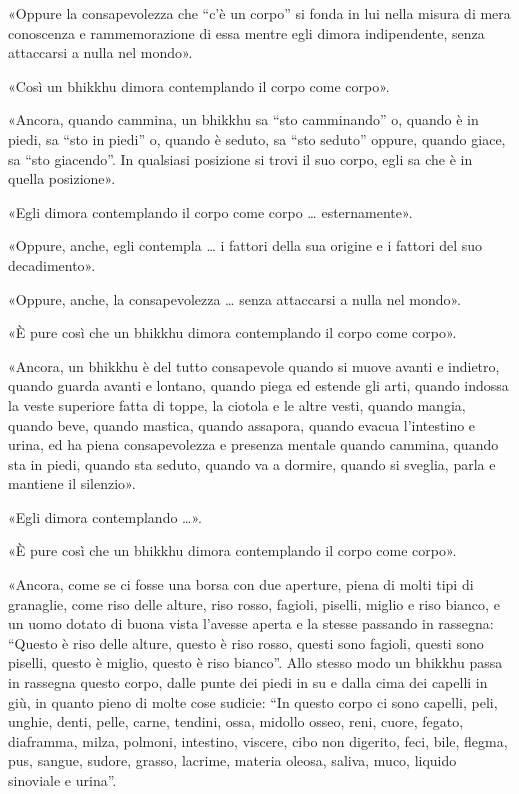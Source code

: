 «Oppure la consapevolezza che “c’è un corpo” si fonda in lui nella
misura di mera conoscenza e rammemorazione di essa mentre egli dimora
indipendente, senza attaccarsi a nulla nel mondo».


«Così un bhikkhu dimora contemplando il corpo come corpo».


«Ancora, quando cammina, un bhikkhu sa “sto camminando” o, quando è in
piedi, sa “sto in piedi” o, quando è seduto, sa “sto seduto” oppure,
quando giace, sa “sto giacendo”. In qualsiasi posizione si trovi il suo
corpo, egli sa che è in quella posizione».


«Egli dimora contemplando il corpo come corpo … esternamente».


«Oppure, anche, egli contempla … i fattori della sua origine e i fattori
del suo decadimento».


«Oppure, anche, la consapevolezza … senza attaccarsi a nulla nel mondo».


«È pure così che un bhikkhu dimora contemplando il corpo come corpo».


«Ancora, un bhikkhu è del tutto consapevole quando si muove avanti e
indietro, quando guarda avanti e lontano, quando piega ed estende gli
arti, quando indossa la veste superiore fatta di toppe, la ciotola e le
altre vesti, quando mangia, quando beve, quando mastica, quando
assapora, quando evacua l’intestino e urina, ed ha piena consapevolezza
e presenza mentale quando cammina, quando sta in piedi, quando sta
seduto, quando va a dormire, quando si sveglia, parla e mantiene il
silenzio».


«Egli dimora contemplando …».


«È pure così che un bhikkhu dimora contemplando il corpo come corpo».


«Ancora, come se ci fosse una borsa con due aperture, piena di molti
tipi di granaglie, come riso delle alture, riso rosso, fagioli, piselli,
miglio e riso bianco, e un uomo dotato di buona vista l’avesse aperta e
la stesse passando in rassegna: “Questo è riso delle alture, questo è
riso rosso, questi sono fagioli, questi sono piselli, questo è miglio,
questo è riso bianco”. Allo stesso modo un bhikkhu passa in rassegna
questo corpo, dalle punte dei piedi in su e dalla cima dei capelli in
giù, in quanto pieno di molte cose sudicie: “In questo corpo ci sono
capelli, peli, unghie, denti, pelle, carne, tendini, ossa, midollo
osseo, reni, cuore, fegato, diaframma, milza, polmoni, intestino,
viscere, cibo non digerito, feci, bile, flegma, pus, sangue, sudore,
grasso, lacrime, materia oleosa, saliva, muco, liquido sinoviale e
urina”.


